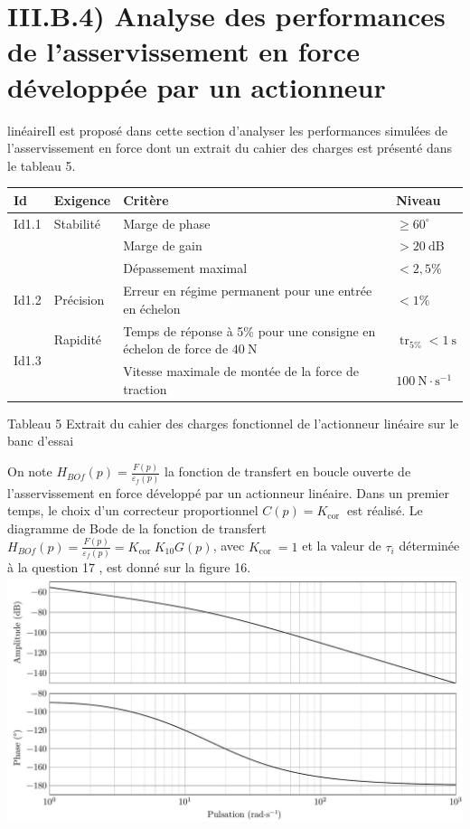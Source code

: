 \documentclass[10pt]{article}
\begin{document}
\section*{III.B.4) Analyse des performances de l'asservissement en force développée par un actionneur}
 linéaireIl est proposé dans cette section d'analyser les performances simulées de l'asservissement en force dont un extrait du cahier des charges est présenté dans le tableau 5.

\begin{center}
\begin{tabular}{|l|l|l|l|}
\hline
Id & Exigence & Critère & Niveau \\
\hline
Id1.1 & Stabilité & Marge de phase & $\geqslant 60^{\circ}$ \\
\cline { 3 - 5 }
 &  & Marge de gain & $>20 \mathrm{~dB}$ \\
\cline { 3 - 4 }
 &  & Dépassement maximal & $<2,5 \%$ \\
\hline
Id1.2 & Précision & Erreur en régime permanent pour une entrée en échelon & $<1 \%$ \\
\hline
\multirow{2}{*}{Id1.3} & Rapidité & Temps de réponse à 5\% pour une consigne en échelon de force de $40 \mathrm{~N}$ & $\operatorname{tr}_{5 \%}<1 \mathrm{~s}$ \\
\cline { 3 - 5 }
 &  & Vitesse maximale de montée de la force de traction & $100 \mathrm{~N} \cdot \mathrm{s}^{-1}$ \\
\hline
\end{tabular}
\end{center}

Tableau 5 Extrait du cahier des charges fonctionnel de l'actionneur linéaire sur le banc d'essai

On note $H_{B O f}(p)=\frac{F(p)}{\varepsilon_{f}(p)}$ la fonction de transfert en boucle ouverte de l'asservissement en force développé par un actionneur linéaire. Dans un premier temps, le choix d'un correcteur proportionnel $C(p)=K_{\text {cor }}$ est réalisé. Le diagramme de Bode de la fonction de transfert $H_{B O f}(p)=\frac{F(p)}{\varepsilon_{f}(p)}=K_{\text {cor }} K_{10} G(p)$, avec $K_{\text {cor }}=1$ et la valeur de $\tau_{i}$ déterminée à la question 17 , est donné sur la figure 16.\\
\includegraphics[max width=\textwidth, center]{2024_03_20_0c3cf888f6e04b1986bcg-12(1)}
\end{document}
